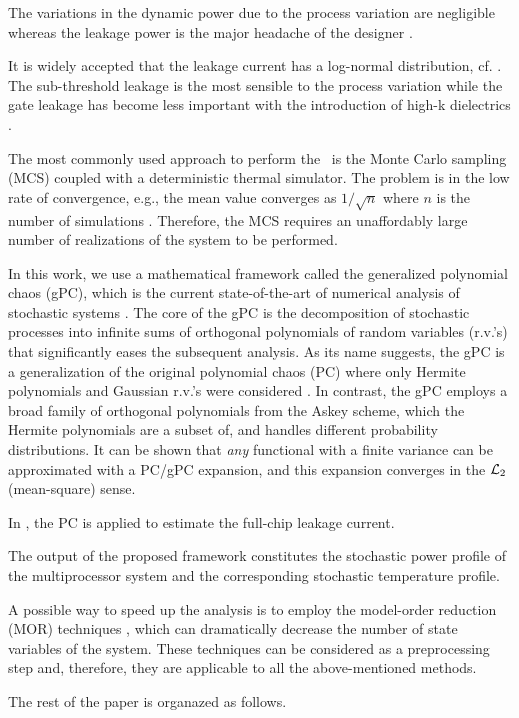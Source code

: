 The variations in the dynamic power due to the process variation are negligible whereas the leakage power is the major headache of the designer \cite{juan2012, srivastava2010}.

It is widely accepted that the leakage current has a log-normal distribution, cf. \cite{juan2012, srivastava2010}. The sub-threshold leakage is the most sensible to the process variation while the gate leakage has become less important with the introduction of high-k dielectrics \cite{juan2012}.

The most commonly used approach to perform the \sta\ is the Monte Carlo sampling (MCS) coupled with a deterministic thermal simulator. The problem is in the low rate of convergence, e.g., the mean value converges as $1/\sqrt{n}$ where $n$ is the number of simulations \cite{xiu2009}. Therefore, the MCS requires an unaffordably large number of realizations of the system to be performed.

In this work, we use a mathematical framework called the generalized polynomial chaos (gPC), which is the current state-of-the-art of numerical analysis of stochastic systems \cite{xiu2009, xiu2002}. The core of the gPC is the decomposition of stochastic processes into infinite sums of orthogonal polynomials of random variables (r.v.'s) that significantly eases the subsequent analysis. As its name suggests, the gPC is a generalization of the original polynomial chaos (PC) where only Hermite polynomials and Gaussian r.v.'s were considered \cite{ghanem1991}. In contrast, the gPC employs a broad family of orthogonal polynomials from the Askey scheme, which the Hermite polynomials are a subset of, and handles different probability distributions. It can be shown that \emph{any} functional with a finite variance can be approximated with a PC/gPC expansion, and this expansion converges in the $\mathcal{L}_{2}$ (mean-square) sense.

In \cite{shen2009}, the PC is applied to estimate the full-chip leakage current.

The output of the proposed framework constitutes the stochastic power profile of the multiprocessor system and the corresponding stochastic temperature profile.

A possible way to speed up the analysis is to employ the model-order reduction (MOR) techniques \cite{benner2011}, which can dramatically decrease the number of state variables of the system. These techniques can be considered as a preprocessing step and, therefore, they are applicable to all the above-mentioned methods.

The rest of the paper is organazed as follows.
